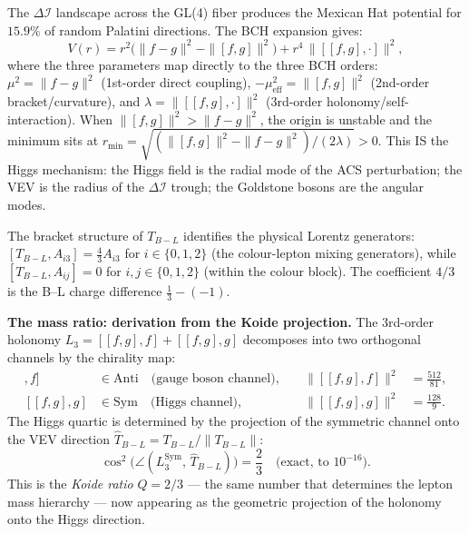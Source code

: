 \documentclass[11pt,a4paper]{article}
\theoremstyle{plain}
\theoremstyle{definition}
\theoremstyle{remark}
\newcommand{\DI}{\Delta\mathcal{I}}
\begin{document}
The $\DI$ landscape across the GL(4) fiber produces the
Mexican Hat potential for $15.9\%$ of random Palatini directions.
The BCH expansion gives:
\begin{equation}\label{eq:higgs-bch}
  V(r) = r^2\bigl(\|f{-}g\|^2 - \|[f,g]\|^2\bigr)
       + r^4\,\|[[f,g],\cdot]\|^2,
\end{equation}
where the three parameters map directly to the three BCH orders:
$\mu^2 = \|f{-}g\|^2$ (1st-order direct coupling),
$-\mu_{\mathrm{eff}}^2 = \|[f,g]\|^2$ (2nd-order bracket/curvature),
and $\lambda = \|[[f,g],\cdot]\|^2$ (3rd-order holonomy/self-interaction).
When $\|[f,g]\|^2 > \|f{-}g\|^2$, the origin is unstable and the
minimum sits at $r_{\min} = \sqrt{(\|[f,g]\|^2 - \|f{-}g\|^2)/(2\lambda)} > 0$.
This IS the Higgs mechanism: the Higgs field is the radial mode
of the ACS perturbation; the VEV is the radius of the $\DI$ trough;
the Goldstone bosons are the angular modes.

The bracket structure of $T_{B{-}L}$ identifies the physical Lorentz
generators: $[T_{B{-}L}, A_{i3}] = \tfrac{4}{3} A_{i3}$ for
$i \in \{0,1,2\}$ (the colour-lepton mixing generators), while
$[T_{B{-}L}, A_{ij}] = 0$ for $i,j \in \{0,1,2\}$
(within the colour block).  The coefficient $4/3$ is the B--L
charge difference $\tfrac{1}{3} - (-1)$.

\textbf{The mass ratio: derivation from the Koide projection.}
The 3rd-order holonomy $L_3 = [[f,g],f] + [[f,g],g]$ decomposes
into two orthogonal channels by the chirality map:
\begin{align}
  [[f,g],f] &\in \mathrm{Anti} \quad\text{(gauge boson channel)},
    &\quad \|[[f,g],f]\|^2 &= \tfrac{512}{81}, \label{eq:L3-anti}\\
  [[f,g],g] &\in \mathrm{Sym} \quad\text{(Higgs channel)},
    &\quad \|[[f,g],g]\|^2 &= \tfrac{128}{9}. \label{eq:L3-sym}
\end{align}
The Higgs quartic is determined by the projection of the symmetric
channel onto the VEV direction $\hat{T}_{B{-}L} = T_{B{-}L}/\|T_{B{-}L}\|$:
\begin{equation}\label{eq:koide-projection}
  \cos^2\!\bigl(\angle(L_3^{\mathrm{Sym}},\, \hat{T}_{B{-}L})\bigr)
  = \frac{2}{3} \quad\text{(exact, to $10^{-16}$)}.
\end{equation}
This is the \emph{Koide ratio} $Q = 2/3$ --- the same number that
determines the lepton mass hierarchy --- now appearing as the
geometric projection of the holonomy onto the Higgs direction.
\end{document}
